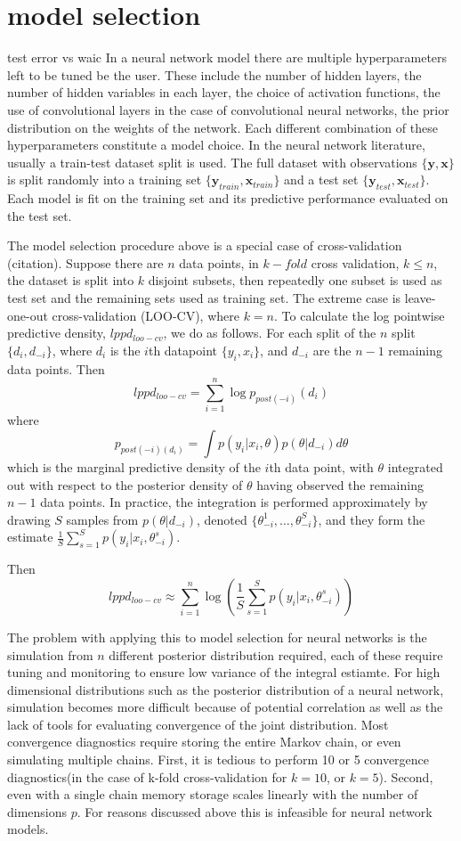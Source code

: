 \documentclass[]{report}
\begin{document}
\section{model selection}
test error vs waic 
In a neural network model there are multiple hyperparameters left to be tuned be
the user. These include the number of hidden layers, the number of hidden
variables in each layer, the choice of activation functions, the use of
convolutional layers in the case of convolutional neural networks, the prior
distribution on the weights of the network. Each different combination of these
hyperparameters constitute a model choice. In the neural network literature,
usually a train-test dataset split is used. The full dataset with observations
$\{\textbf{y},\textbf{x}\}$ is split randomly into a training set
$\{\textbf{y}_{train}, \textbf{x}_{train}\}$ and a test set $\{\textbf{y}_{test},
\textbf{x}_{test} \}$. Each model is fit on the training set and its predictive
performance evaluated on the test set.

The model selection procedure above is a special case of cross-validation
(citation). Suppose there are $n$ data points, in $k-fold$ cross validation,
$k\le n$, the dataset is split into $k$ disjoint subsets, then repeatedly one
subset is used as test set and the remaining sets used as training set. The
extreme case is leave-one-out cross-validation (LOO-CV), where $k=n$. To
calculate the log pointwise predictive density, $lppd_{loo-cv}$, we do as
follows. For each split of the $n$ split $\{d_i,d_{-i}\}$, where $d_i$ is the
$i$th datapoint $\{y_i,x_i\}$, and $d_{-i}$ are the $n-1$ remaining data points.
Then
\[ lppd_{loo-cv} = \sum_{i=1}^n \log p_{post(-i)}(d_i) \]
where 
\[p_{post(-i)(d_i)} = \int p(y_i|x_i,\theta) p(\theta |d_{-i}) d\theta \]
which is the marginal predictive density of the $i$th data point, with $\theta$
integrated out with respect to the posterior density of $\theta$ having observed
the remaining $n-1$ data points. In practice, the integration is performed
approximately by drawing $S$ samples from $p(\theta|d_{-i})$, denoted
$\{\theta_{-i}^1,\dots, \theta_{-i}^S\}$, and they form the estimate
$\frac{1}{S} \sum_{s=1}^S p(y_i|x_i,\theta_{-i}^s) $.

Then
\[lppd_{loo-cv} \approx \sum_{i=1}^n \log (\frac{1}{S} \sum_{s=1}^S
p(y_i|x_i,\theta_{-i}^s))\]

The problem with applying this to model selection for neural networks is the
simulation from $n$ different posterior distribution required, each of these
require tuning and monitoring to ensure low variance of the integral estiamte.
For high dimensional distributions such as the posterior distribution of a neural
network, simulation becomes more difficult because of potential correlation as
well as the lack of tools for evaluating convergence of the joint distribution.
Most convergence diagnostics require storing the entire Markov chain, or even
simulating multiple chains. First, it is tedious to perform 10 or 5 convergence
diagnostics(in the case of k-fold cross-validation for $k=10$, or $k=5$).
Second, even with a single chain memory storage scales
linearly with the number of dimensions $p$. For reasons discussed above this is
infeasible for neural network models. 
\end{document}
